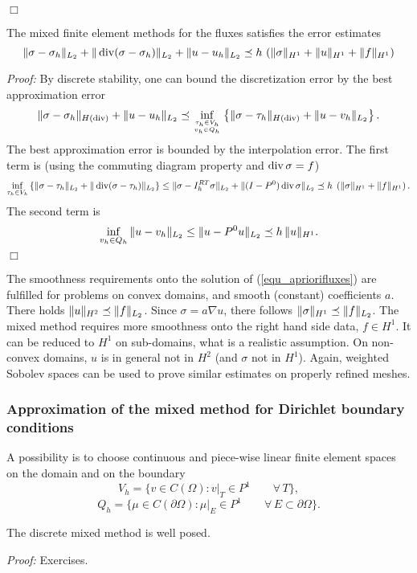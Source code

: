 \hfill $\Box$

\begin{theorem} The mixed finite element methods for 
the fluxes satisfies the error estimates
\begin{equation}
\label{equ_apriorifluxes}
\| \sigma - \sigma_h \|_{L_2} + \| \operatorname{div} (\sigma - \sigma_h) \|_{L_2} +
\| u - u_h \|_{L_2} \preceq h \, \left( \| \sigma \|_{H^1} + \| u \|_{H^1} + \| f \|_{H^1} \right)
\end{equation}
\end{theorem}
{\em Proof:} By discrete stability, one can bound the discretization error
by the best approximation error
$$
\| \sigma - \sigma_h \|_{H(\operatorname{div})} + \| u - u_h \|_{L_2} \preceq
\inf_{\tau_h \in V_h \atop v_h \in Q_h } \left\{ \| \sigma - \tau_h \|_{H(\operatorname{div})} + \| u - v_h \|_{L_2} \right\}.
$$
The best approximation error is bounded by the interpolation error. The first
term is (using the commuting diagram property and  $\operatorname{div} \sigma = f$)
$$
\inf_{\tau_h \in V_h } \left\{ \| \sigma - \tau_h \|_{L_2} + \| \operatorname{div}( \sigma - \tau_h) \|_{L_2} \right\}
\leq \| \sigma - I_h^{RT} \sigma \|_{L_2} + \| (I-P^0) \operatorname{div} \sigma \|_{L_2}
        \preceq h \; \left( \| \sigma \|_{H^1} + \| f \|_{H^1} \right).
$$
The second term is
$$
\inf_{v_h \in Q_h} \| u - v_h \|_{L_2} \leq \| u - P^0 u \|_{L_2} \preceq h \, \| u \|_{H^1}.
$$
\hfill $\Box$

\bigskip

The smoothness requirements onto the solution of (\ref{equ_apriorifluxes})
are fulfilled for problems on convex domains, and smooth (constant) 
coefficients $a$. 
There holds $\|u \|_{H^2} \preceq \| f \|_{L_2}$. Since $\sigma = a \nabla u$,
there follows $\| \sigma \|_{H^1} \preceq \| f \|_{L_2}$. The mixed method
requires more smoothness onto the right hand side data, $f \in H^1$. 
It can be reduced to $H^1$ on sub-domains, what is a realistic assumption.
On non-convex domains, $u$ is in general not in $H^2$ (and $\sigma$ not in $H^1$). Again, weighted Sobolev spaces can be used to prove similar estimates
on properly refined meshes.

\subsubsection{Approximation of the mixed method for Dirichlet boundary conditions}
A possibility is to choose continuous and piece-wise linear finite element
spaces on the domain and on the boundary
$$
V_h = \{ v \in C(\Omega) : v|_T \in P^1 \qquad \forall \, T\},
$$
$$
Q_h = \{ \mu \in C(\partial \Omega) : \mu|_E \in P^1 \qquad \forall \, E \subset \partial \Omega\}.
$$
\begin{theorem} The discrete mixed method is well posed.
\end{theorem}
{\em Proof: } Exercises.




